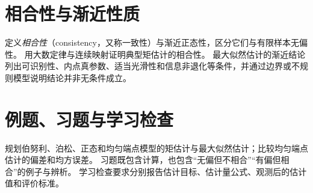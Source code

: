 \section{相合性与渐近性质}
\label{sec:ps-estimation-asymptotics}
定义\emph{相合性}（consistency，又称一致性）与渐近正态性，区分它们与有限样本无偏性。
用大数定律与连续映射证明典型矩估计的相合性。
最大似然估计的渐近结论列出可识别性、内点真参数、适当光滑性和信息非退化等条件，并通过边界或不规则模型说明结论并非无条件成立。

\section{例题、习题与学习检查}
规划伯努利、泊松、正态和均匀端点模型的矩估计与最大似然估计；比较均匀端点估计的偏差和均方误差。
习题既包含计算，也包含“无偏但不相合”“有偏但相合”的例子与辨析。
学习检查要求分别报告估计目标、估计量公式、观测后的估计值和评价标准。






